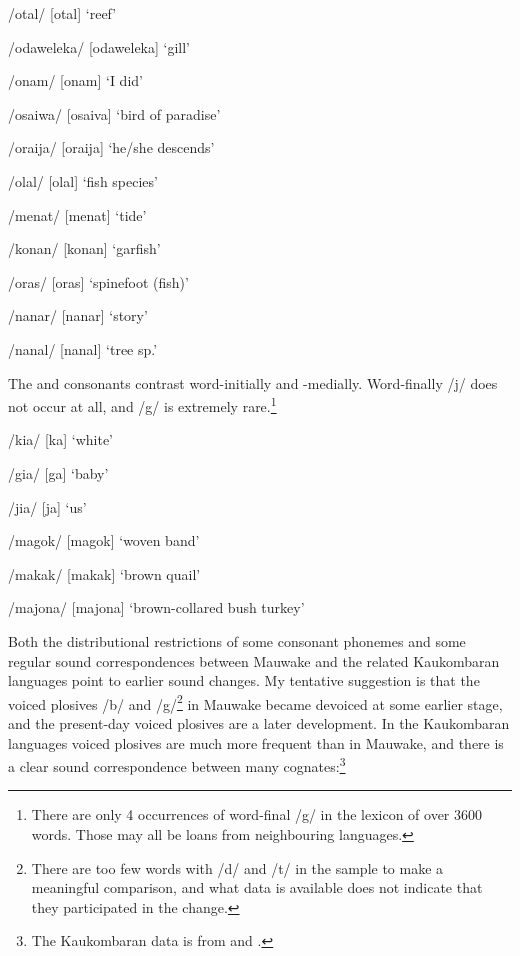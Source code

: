 /otal/  [o{{\textprimstress}tal}]  `reef'

/odaweleka/  [o{{\textprimstress}daweleka}]  `gill'

/onam/  [o{{\textprimstress}nam}]  `I did'

/osaiwa/  [o{{\textprimstress}saiva}]  `bird of paradise'

/oraija/  [o{{\textprimstress}raija}]  `he/she descends'

/olal/  [o{{\textprimstress}lal}]  `fish species'

/menat/  [me{{\textprimstress}nat}]  `tide'

/konan/  [ko{{\textprimstress}nan}]  `garfish'

/oras/  [o{{\textprimstress}ras}]  `spinefoot (fish)'

/nanar/  [na{{\textprimstress}nar}]  `story'

/nanal/  [na{{\textprimstress}nal}]  `tree sp.'

The  and  consonants contrast word-initially and -medially. Word-finally /j/ does not occur at all, and /g/ is extremely rare.\footnote{There are only 4 occurrences of word-final /g/ in the lexicon of over 3600 words. Those may all be loans from neighbouring languages.}

/kia/  [k{\textsci{{\textprimstress}}}a]  `white'

/gia/  [g{\textsci{{\textprimstress}}}a]  `baby'

/jia/  [j{\textsci{{\textprimstress}}}a]  `us'

/magok/  [ma{{\textprimstress}gok}]  `woven band'

/makak/  [ma{{\textprimstress}kak}]  `brown quail'

/majona/  [ma{{\textprimstress}jona}]  `brown-collared bush turkey'

Both the distributional restrictions of some consonant phonemes and some regular sound correspondences between Mauwake and the related Kaukombaran languages point to earlier sound changes. My tentative suggestion is that the voiced plosives /b/ and /g/\footnote{There are too few words with /d/ and /t/ in the sample to make a meaningful comparison, and what data is available does not indicate that they participated in the change.}  in Mauwake became devoiced at some earlier stage, and the present-day voiced plosives are a later development. In the Kaukombaran languages voiced plosives are much more frequent than in Mauwake, and there is a clear sound correspondence between many cognates:\footnote{The Kaukombaran data is from \citet{LoewekeEtAlms} and \citep{ZGraggen1980}.} 

